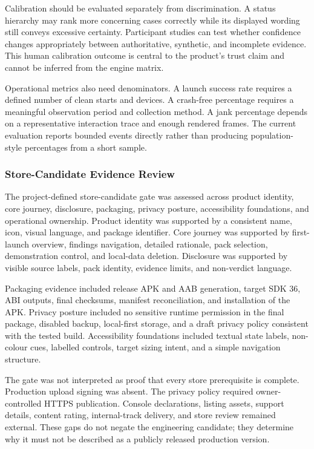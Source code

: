 Calibration should be evaluated separately from discrimination. A status hierarchy may rank more concerning cases correctly while its displayed wording still conveys excessive certainty. Participant studies can test whether confidence changes appropriately between authoritative, synthetic, and incomplete evidence. This human calibration outcome is central to the product's trust claim and cannot be inferred from the engine matrix.

Operational metrics also need denominators. A launch success rate requires a defined number of clean starts and devices. A crash-free percentage requires a meaningful observation period and collection method. A jank percentage depends on a representative interaction trace and enough rendered frames. The current evaluation reports bounded events directly rather than producing population-style percentages from a short sample.

\subsubsection{Store-Candidate Evidence Review}

The project-defined store-candidate gate was assessed across product identity, core journey, disclosure, packaging, privacy posture, accessibility foundations, and operational ownership. Product identity was supported by a consistent name, icon, visual language, and package identifier. Core journey was supported by first-launch overview, findings navigation, detailed rationale, pack selection, demonstration control, and local-data deletion. Disclosure was supported by visible source labels, pack identity, evidence limits, and non-verdict language.

Packaging evidence included release APK and AAB generation, target SDK 36, ABI outputs, final checksums, manifest reconciliation, and installation of the APK. Privacy posture included no sensitive runtime permission in the final package, disabled backup, local-first storage, and a draft privacy policy consistent with the tested build. Accessibility foundations included textual state labels, non-colour cues, labelled controls, target sizing intent, and a simple navigation structure.

The gate was not interpreted as proof that every store prerequisite is complete. Production upload signing was absent. The privacy policy required owner-controlled HTTPS publication. Console declarations, listing assets, support details, content rating, internal-track delivery, and store review remained external. These gaps do not negate the engineering candidate; they determine why it must not be described as a publicly released production version.

